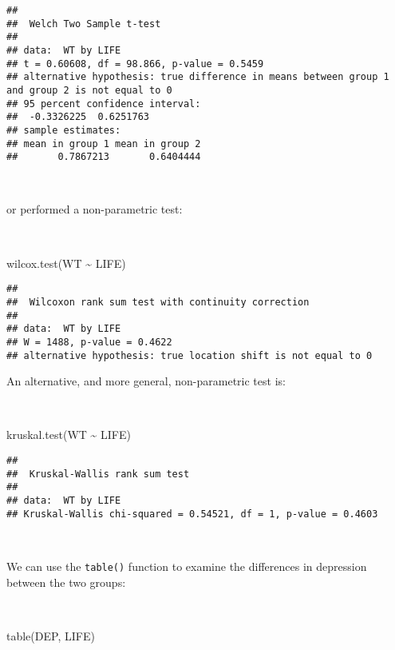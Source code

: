 \documentclass[
  12pt,
  a4paper]{book}
\newenvironment{Shaded}{\begin{snugshade}}{\end{snugshade}}
\newcommand{\FunctionTok}[1]{\textcolor[rgb]{0.00,0.00,0.00}{#1}}
\newcommand{\NormalTok}[1]{#1}
\newcommand{\SpecialCharTok}[1]{\textcolor[rgb]{0.00,0.00,0.00}{#1}}
\begin{document}
\begin{verbatim}
## 
##  Welch Two Sample t-test
## 
## data:  WT by LIFE
## t = 0.60608, df = 98.866, p-value = 0.5459
## alternative hypothesis: true difference in means between group 1 and group 2 is not equal to 0
## 95 percent confidence interval:
##  -0.3326225  0.6251763
## sample estimates:
## mean in group 1 mean in group 2 
##       0.7867213       0.6404444
\end{verbatim}

~

or performed a non-parametric test:

~

\begin{Shaded}
\begin{Highlighting}[]
\FunctionTok{wilcox.test}\NormalTok{(WT }\SpecialCharTok{\textasciitilde{}}\NormalTok{ LIFE)}
\end{Highlighting}
\end{Shaded}

\begin{verbatim}
## 
##  Wilcoxon rank sum test with continuity correction
## 
## data:  WT by LIFE
## W = 1488, p-value = 0.4622
## alternative hypothesis: true location shift is not equal to 0
\end{verbatim}

\newpage

An alternative, and more general, non-parametric test is:

~

\begin{Shaded}
\begin{Highlighting}[]
\FunctionTok{kruskal.test}\NormalTok{(WT }\SpecialCharTok{\textasciitilde{}}\NormalTok{ LIFE)}
\end{Highlighting}
\end{Shaded}

\begin{verbatim}
## 
##  Kruskal-Wallis rank sum test
## 
## data:  WT by LIFE
## Kruskal-Wallis chi-squared = 0.54521, df = 1, p-value = 0.4603
\end{verbatim}

~

We can use the \texttt{table()} function to examine the differences in depression between the two groups:

~

\begin{Shaded}
\begin{Highlighting}[]
\FunctionTok{table}\NormalTok{(DEP, LIFE)}
\end{Highlighting}
\end{Shaded}
\end{document}
